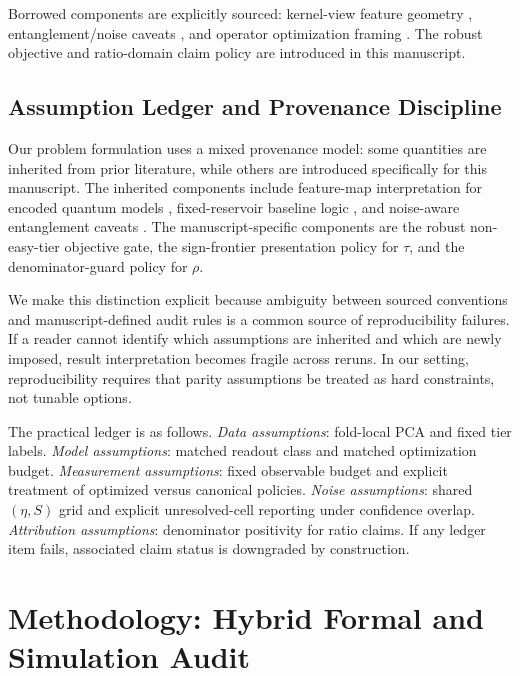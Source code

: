 \documentclass{article} %
\begin{document}
Borrowed components are explicitly sourced: kernel-view feature geometry \citep{arxiv_2101_11020,arxiv_2008_08605}, entanglement/noise caveats \citep{arxiv_2509_06873,arxiv_2601_23084}, and operator optimization framing \citep{arxiv_2602_14677,arxiv_2602_18377}. The robust objective and ratio-domain claim policy are introduced in this manuscript.


\subsection{Assumption Ledger and Provenance Discipline}
Our problem formulation uses a mixed provenance model: some quantities are inherited from prior literature, while others are introduced specifically for this manuscript. The inherited components include feature-map interpretation for encoded quantum models \citep{arxiv_2101_11020,arxiv_2008_08605}, fixed-reservoir baseline logic \citep{url_echo_state_2001,doi_10_1162_089976602760407955}, and noise-aware entanglement caveats \citep{arxiv_2509_06873,arxiv_2601_23084}. The manuscript-specific components are the robust non-easy-tier objective gate, the sign-frontier presentation policy for $\tau$, and the denominator-guard policy for $\rho$.

We make this distinction explicit because ambiguity between sourced conventions and manuscript-defined audit rules is a common source of reproducibility failures. If a reader cannot identify which assumptions are inherited and which are newly imposed, result interpretation becomes fragile across reruns. In our setting, reproducibility requires that parity assumptions be treated as hard constraints, not tunable options.

The practical ledger is as follows. \emph{Data assumptions}: fold-local PCA and fixed tier labels. \emph{Model assumptions}: matched readout class and matched optimization budget. \emph{Measurement assumptions}: fixed observable budget and explicit treatment of optimized versus canonical policies. \emph{Noise assumptions}: shared $(\eta,S)$ grid and explicit unresolved-cell reporting under confidence overlap. \emph{Attribution assumptions}: denominator positivity for ratio claims. If any ledger item fails, associated claim status is downgraded by construction.

\section{Methodology: Hybrid Formal and Simulation Audit}
\label{sec:method}
\end{document}
